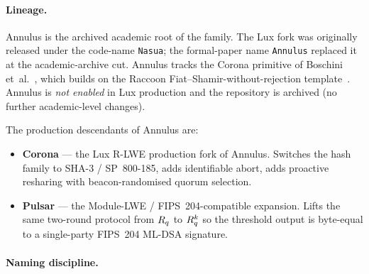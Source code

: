 \paragraph{Lineage.} Annulus is the archived academic root of the
family. The Lux fork was originally released under the code-name
\texttt{Nasua}; the formal-paper name \texttt{Annulus} replaced it
at the academic-archive cut. Annulus tracks the Corona primitive
of Boschini et~al.~\cite{boschini2024ringtail}, which builds on
the Raccoon Fiat--Shamir-without-rejection template~\cite{raccoon2024}.
Annulus is \emph{not enabled} in Lux production and the repository
is archived (no further academic-level changes).

The production descendants of Annulus are:
\begin{itemize}[leftmargin=*, itemsep=0pt]
\item \textbf{Corona} --- the Lux R-LWE production fork of Annulus.
Switches the hash family to SHA-3 / SP~800-185, adds identifiable
abort, adds proactive resharing with beacon-randomised quorum
selection.
\item \textbf{Pulsar} --- the Module-LWE / FIPS~204-compatible
expansion. Lifts the same two-round protocol from $R_q$ to $R_q^k$
so the threshold output is byte-equal to a single-party FIPS~204
ML-DSA signature.
\end{itemize}

\paragraph{Naming discipline.}

